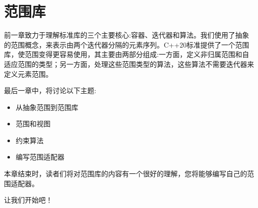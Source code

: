 \chapter{范围库}
前一章致力于理解标准库的三个主要核心:容器、迭代器和算法。我们使用了抽象的范围概念，来表示由两个迭代器分隔的元素序列。C++20标准提供了一个范围库，使范围变得更容易使用，其主要由两部分组成:一方面，定义非归属范围和自适应范围的类型；另一方面，处理这些范围类型的算法，这些算法不需要迭代器来定义元素范围。

最后一章中，将讨论以下主题:

\begin{itemize}
  \item 从抽象范围到范围库
  \item 范围和视图
  \item 约束算法
  \item 编写范围适配器
\end{itemize}

本章结束时，读者们将对范围库的内容有一个很好的理解，您将能够编写自己的范围适配器。

让我们开始吧！







